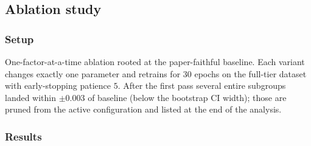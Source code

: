 \subsection{Ablation study}
\label{subsec:exp_ablation}

\subsubsection*{Setup}

One-factor-at-a-time ablation rooted at the paper-faithful baseline.
Each variant changes exactly one parameter and retrains for $30$ epochs on the full-tier dataset with early-stopping patience $5$.
After the first pass several entire subgroups landed within $\pm 0.003$ of baseline (below the bootstrap CI width); those are pruned from the active configuration and listed at the end of the analysis.

\subsubsection*{Results}

